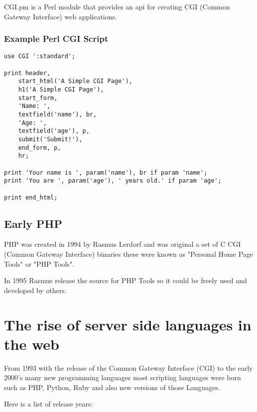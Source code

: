 \documentclass{book}
\begin{document}
CGI.pm is a Perl module that provides an api for creating CGI (Common Gateway Interface) web applications.

\subsection{Example Perl CGI Script}
\begin{lstlisting}
use CGI ':standard';
 
print header,
    start_html('A Simple CGI Page'),
    h1('A Simple CGI Page'),
    start_form,
    'Name: ',
    textfield('name'), br,
    'Age: ',
    textfield('age'), p,
    submit('Submit!'),
    end_form, p,
    hr;
 
print 'Your name is ', param('name'), br if param 'name';
print 'You are ', param('age'), ' years old.' if param 'age';
 
print end_html;

\end{lstlisting}

\section{Early PHP}
PHP was created in 1994 by Rasmus Lerdorf and was original a set of C CGI (Common Gateway Interface) binaries these were known as "Personal Home Page Tools" or "PHP Tools".

In 1995 Rasmus release the source for PHP Tools so it could be freely used and developed by others.


\chapter{The rise of server side languages in the web}
From 1993 with the release of the Common Gateway Interface (CGI) to the early 2000's many new programming languages most scripting languages were born such as PHP, Python, Ruby and also new versions of those Languages.

Here is a list of release years\cite{royal-pingdom}: 
\end{document}
